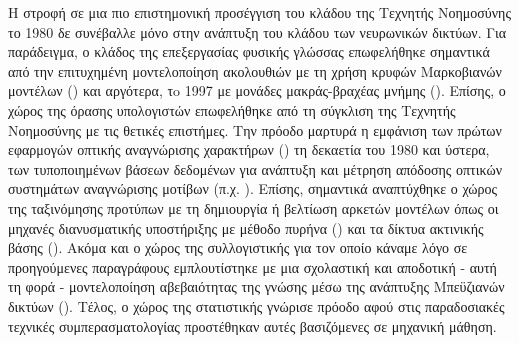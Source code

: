 Η στροφή σε μια πιο επιστημονική προσέγγιση του κλάδου της Τεχνητής Νοημοσύνης το 1980 δε συνέβαλλε μόνο στην ανάπτυξη του κλάδου των νευρωνικών δικτύων. Για παράδειγμα, ο κλάδος της επεξεργασίας φυσικής γλώσσας επωφελήθηκε σημαντικά από την επιτυχημένη μοντελοποίηση ακολουθιών με τη χρήση κρυφών Μαρκοβιανών μοντέλων () και αργότερα, τo 1997 με μονάδες μακράς-βραχέας μνήμης (). Επίσης, ο χώρος της όρασης υπολογιστών επωφελήθηκε από τη σύγκλιση της Τεχνητής Νοημοσύνης με τις θετικές επιστήμες. Την πρόοδο μαρτυρά η εμφάνιση των πρώτων εφαρμογών οπτικής αναγνώρισης χαρακτήρων () τη δεκαετία του 1980 και ύστερα, των τυποποιημένων βάσεων δεδομένων για ανάπτυξη και μέτρηση απόδοσης οπτικών συστημάτων αναγνώρισης μοτίβων (π.χ. \cite{lecun1998gradientMNIST}). Επίσης, σημαντικά αναπτύχθηκε ο χώρος της ταξινόμησης προτύπων με τη δημιουργία ή βελτίωση αρκετών μοντέλων όπως οι μηχανές διανυσματικής υποστήριξης με μέθοδο πυρήνα () και τα δίκτυα ακτινικής βάσης (). Ακόμα και ο χώρος της συλλογιστικής για τον οποίο κάναμε λόγο σε προηγούμενες παραγράφους εμπλουτίστηκε με μια σχολαστική και αποδοτική - αυτή τη φορά - μοντελοποίηση αβεβαιότητας της γνώσης μέσω της ανάπτυξης Μπεϋζιανών δικτύων (). Τέλος, ο χώρος της στατιστικής γνώρισε πρόοδο αφού στις παραδοσιακές τεχνικές συμπερασματολογίας προστέθηκαν αυτές βασιζόμενες σε μηχανική μάθηση.
\par

